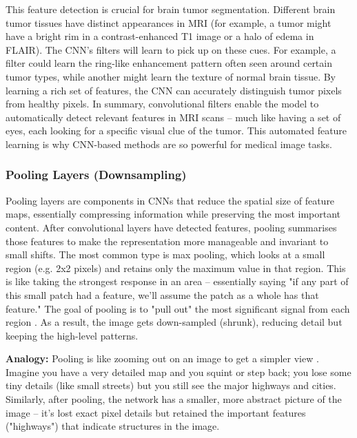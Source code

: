 This feature detection is crucial for brain tumor segmentation. Different brain tumor tissues have distinct appearances in MRI (for example, a tumor might have a bright rim in a contrast-enhanced T1 image or a halo of edema in FLAIR). The CNN's filters will learn to pick up on these cues. For example, a filter could learn the ring-like enhancement pattern often seen around certain tumor types, while another might learn the texture of normal brain tissue. By learning a rich set of features, the CNN can accurately distinguish tumor pixels from healthy pixels. In summary, convolutional filters enable the model to automatically detect relevant features in MRI scans – much like having a set of eyes, each looking for a specific visual clue of the tumor. This automated feature learning is why CNN-based methods are so powerful for medical image tasks.

\subsubsection{Pooling Layers (Downsampling)}
\label{sec:pooling_layers}

Pooling layers are components in CNNs that reduce the spatial size of feature maps, essentially compressing information while preserving the most important content. After convolutional layers have detected features, pooling summarises those features to make the representation more manageable and invariant to small shifts. The most common type is max pooling, which looks at a small region (e.g. 2x2 pixels) and retains only the maximum value in that region. This is like taking the strongest response in an area – essentially saying "if any part of this small patch had a feature, we'll assume the patch as a whole has that feature." The goal of pooling is to "pull out" the most significant signal from each region \cite{datacamp2023cnn}. As a result, the image gets down-sampled (shrunk), reducing detail but keeping the high-level patterns.

\textbf{Analogy:} Pooling is like zooming out on an image to get a simpler view \cite{medium2022cnn}. Imagine you have a very detailed map and you squint or step back; you lose some tiny details (like small streets) but you still see the major highways and cities. Similarly, after pooling, the network has a smaller, more abstract picture of the image – it's lost exact pixel details but retained the important features ("highways") that indicate structures in the image.

